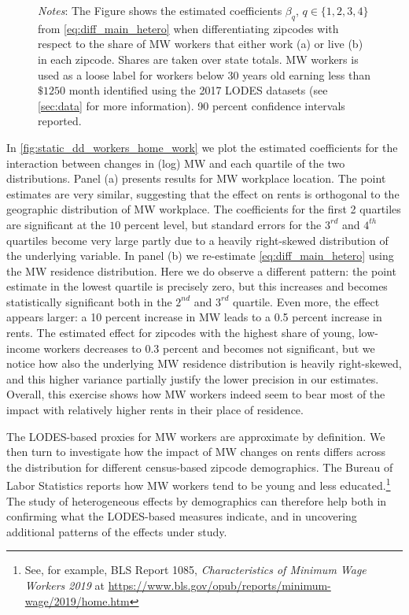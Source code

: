 \begin{figure}[h!]
\begin{minipage}{0.95\textwidth}
		\vspace{2mm} 
		\textit{Notes}: The Figure shows the estimated coefficients $\beta_{q}$, $q \in \{1, 2, 3,
		4\}$ from \autoref{eq:diff_main_hetero} when differentiating zipcodes with respect to the 
		share of MW workers that either work (a) or live (b) in each zipcode. Shares are taken over 
		state totals. MW workers is used as a loose label for workers below 30 years old earning 
		less than $\$1250$ month identified using the 2017 LODES datasets (see \autoref{sec:data} 
		for more information). 90 percent confidence intervals reported.
	\end{minipage}
\end{figure}

In \autoref{fig:static_dd_workers_home_work} we plot the estimated coefficients for the interaction 
between changes in (log) MW and each quartile of the two distributions. Panel (a) presents results 
for MW workplace location. The point estimates are very similar, suggesting that the effect on rents 
is orthogonal to the geographic distribution of MW workplace. The coefficients for the first 2 
quartiles are significant at the $10$ percent level, but standard errors for the $3^{rd}$ and 
$4^{th}$ quartiles become very large partly due to a heavily right-skewed distribution of the 
underlying variable. In panel (b) we re-estimate \autoref{eq:diff_main_hetero} using the MW residence 
distribution. Here we do observe a different pattern: the point estimate in the lowest quartile is 
precisely zero, but this increases and becomes statistically significant both in the $2^{nd}$ and 
$3^{rd}$ quartile. Even more, the effect appears larger: a 10 percent increase in MW leads to a 0.5 
percent increase in rents. The estimated effect for zipcodes with the highest share of young, 
low-income workers decreases to 0.3 percent and becomes not significant, but we notice how also the 
underlying MW residence distribution is heavily right-skewed, and this higher variance partially 
justify the lower precision in our estimates. Overall, this exercise shows how MW workers indeed seem 
to bear most of the impact with relatively higher rents in their place of residence.

The LODES-based proxies for MW workers are approximate by definition. We then turn to investigate 
how the impact of MW changes on rents differs across the distribution for different census-based 
zipcode demographics. The Bureau of Labor Statistics reports how MW workers tend to be young and 
less educated.\footnote{See, for example, BLS Report 1085, \textit{Characteristics of Minimum Wage 
		Workers 2019} at \url{https://www.bls.gov/opub/reports/minimum-wage/2019/home.htm}} 
The study of heterogeneous effects by demographics can therefore help both in confirming what the
LODES-based measures indicate, and in uncovering additional patterns of the effects under study.

